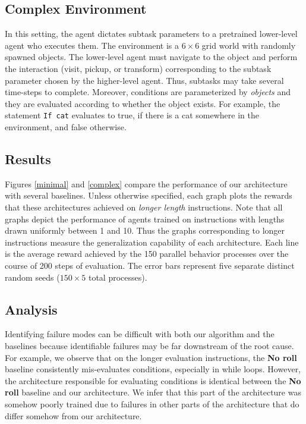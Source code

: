 \documentclass{article}
\begin{document}
\subsection{Complex Environment}
In this setting, the agent dictates subtask parameters to a pretrained
lower-level agent who executes them. The environment is a $6\times 6$ grid world
with randomly spawned objects. The lower-level agent must navigate to the object
and perform the interaction (visit, pickup, or transform) corresponding to the
subtask parameter chosen by the higher-level agent. Thus, subtasks may take several time-steps to
complete. Moreover, conditions are parameterized by \textit{objects} and they
are evaluated according to whether the object exists. For example, the statement
\texttt{If cat} evaluates to true, if there is a cat somewhere in the
environment, and false otherwise.


 
\subsection{Results}
\label{results}
Figures \ref{minimal} and \ref{complex} compare the performance of our
architecture with several baselines. 
Unless otherwise specified, each graph plots the rewards that these architectures achieved on \textit{longer
length} instructions.
 Note that all graphs depict the performance of agents trained on instructions with lengths drawn uniformly between 1 and 10. Thus
the graphs corresponding to longer instructions measure the generalization
capability of each architecture. Each line is the average reward achieved by the
150 parallel behavior processes over the course of
200 steps of evaluation. The error bars represent five separate distinct random
seeds ($150 \times 5$ total processes).

\subsection{Analysis}
Identifying failure modes can be difficult with both our algorithm and the
baselines because identifiable failures may be far downstream of the root cause.
For example, we observe that on the longer evaluation instructions, the
\textbf{No roll} baseline consistently mis-evaluates conditions, especially in
while loops. However, the architecture responsible for evaluating conditions is
identical between the \textbf{No roll} baseline and our architecture. We infer that this
part of the architecture was somehow poorly trained due to failures in other parts
of the architecture that do differ somehow from our architecture.
\end{document}
